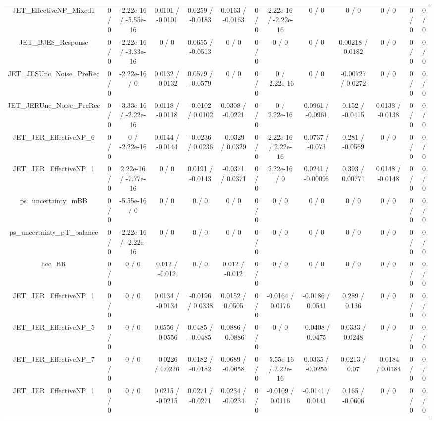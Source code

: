 \documentclass[10pt]{article}
\begin{document}
\begin{table}[htbp]
\begin{center}
\begin{tabular}{|c|c|c|c|c|c|c|c|c|c|c|c|c|}
  JET_EffectiveNP_Mixed1 & 0 / 0 & -2.22e-16 / -5.55e-16 & 0.0101 / -0.0101 & 0.0259 / -0.0183 & 0.0163 / -0.0163 & 0 / 0 & 2.22e-16 / -2.22e-16 & 0 / 0 & 0 / 0 & 0 / 0 & 0 / 0 & 0 / 0 \\ 
  JET_BJES_Response & 0 / 0 & -2.22e-16 / -3.33e-16 & 0 / 0 & 0.0655 / -0.0513 & 0 / 0 & 0 / 0 & 0 / 0 & 0 / 0 & 0.00218 / 0.0182 & 0 / 0 & 0 / 0 & 0 / 0 \\ 
  JET_JESUnc_Noise_PreRec & 0 / 0 & -2.22e-16 / 0 & 0.0132 / -0.0132 & 0.0579 / -0.0579 & 0 / 0 & 0 / 0 & 0 / -2.22e-16 & 0 / 0 & -0.00727 / 0.0272 & 0 / 0 & 0 / 0 & 0 / 0 \\ 
  JET_JERUnc_Noise_PreRec & 0 / 0 & -3.33e-16 / -2.22e-16 & 0.0118 / -0.0118 & -0.0102 / 0.0102 & 0.0308 / -0.0221 & 0 / 0 & 0 / 2.22e-16 & 0.0961 / -0.0961 & 0.152 / -0.0415 & 0.0138 / -0.0138 & 0 / 0 & 0 / 0 \\ 
  JET_JER_EffectiveNP_6 & 0 / 0 & 0 / -2.22e-16 & 0.0144 / -0.0144 & -0.0236 / 0.0236 & -0.0329 / 0.0329 & 0 / 0 & 2.22e-16 / 2.22e-16 & 0.0737 / -0.073 & 0.281 / -0.0569 & 0 / 0 & 0 / 0 & 0 / 0 \\ 
  JET_JER_EffectiveNP_1 & 0 / 0 & 2.22e-16 / -7.77e-16 & 0 / 0 & 0.0191 / -0.0143 & -0.0371 / 0.0371 & 0 / 0 & 2.22e-16 / 0 & 0.0241 / -0.00096 & 0.393 / 0.00771 & 0.0148 / -0.0148 & 0 / 0 & 0 / 0 \\ 
  ps_uncertainty_mBB & 0 / 0 & -5.55e-16 / 0 & 0 / 0 & 0 / 0 & 0 / 0 & 0 / 0 & 0 / 0 & 0 / 0 & 0 / 0 & 0 / 0 & 0 / 0 & 0 / 0 \\ 
  ps_uncertainty_pT_balance & 0 / 0 & -2.22e-16 / -2.22e-16 & 0 / 0 & 0 / 0 & 0 / 0 & 0 / 0 & 0 / 0 & 0 / 0 & 0 / 0 & 0 / 0 & 0 / 0 & 0 / 0 \\ 
  hcc_BR & 0 / 0 & 0 / 0 & 0.012 / -0.012 & 0 / 0 & 0.012 / -0.012 & 0 / 0 & 0 / 0 & 0 / 0 & 0 / 0 & 0 / 0 & 0 / 0 & 0 / 0 \\ 
  JET_JER_EffectiveNP_1 & 0 / 0 & 0 / 0 & 0.0134 / -0.0134 & -0.0196 / 0.0338 & 0.0152 / 0.0505 & 0 / 0 & -0.0164 / 0.0176 & -0.0186 / 0.0541 & 0.289 / 0.136 & 0 / 0 & 0 / 0 & 0 / 0 \\ 
  JET_JER_EffectiveNP_5 & 0 / 0 & 0 / 0 & 0.0556 / -0.0556 & 0.0485 / -0.0485 & 0.0886 / -0.0886 & 0 / 0 & 0 / 0 & -0.0408 / 0.0475 & 0.0333 / 0.0248 & 0 / 0 & 0 / 0 & 0 / 0 \\ 
  JET_JER_EffectiveNP_7 & 0 / 0 & 0 / 0 & -0.0226 / 0.0226 & 0.0182 / -0.0182 & 0.0689 / -0.0658 & 0 / 0 & -5.55e-16 / 2.22e-16 & 0.0335 / -0.0255 & 0.0213 / 0.07 & -0.0184 / 0.0184 & 0 / 0 & 0 / 0 \\ 
  JET_JER_EffectiveNP_1 & 0 / 0 & 0 / 0 & 0.0215 / -0.0215 & 0.0271 / -0.0271 & 0.0234 / -0.0234 & 0 / 0 & -0.0109 / 0.0116 & -0.0141 / 0.0141 & 0.165 / -0.0606 & 0 / 0 & 0 / 0 & 0 / 0 \\ 

\end{tabular}
\end{center}
\end{table}
\end{document}
